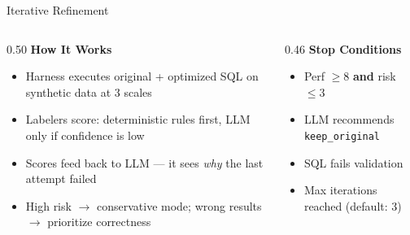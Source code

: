 \documentclass[10pt,aspectratio=169]{beamer}
\newcommand{\Raleway}{\sffamily}
\begin{document}
\begin{frame}{Iterative Refinement}
{%
  }%

  \vspace{0.2em}

  \begin{columns}[T]

    \begin{column}{0.50\textwidth}
      {\small\Raleway\bfseries\color{aggieblue} How It Works}\\[0.2em]
      \footnotesize
      \begin{itemize}
        \setlength{\itemsep}{0.25em}
        \item Harness executes original + optimized SQL on synthetic data at 3 scales
        \item Labelers score: deterministic rules first, LLM only if confidence is low
        \item Scores feed back to LLM --- it sees \textit{why} the last attempt failed
        \item High risk $\to$ conservative mode; wrong results $\to$ prioritize correctness
      \end{itemize}
    \end{column}

    \begin{column}{0.46\textwidth}
      {\small\Raleway\bfseries\color{aggieblue} Stop Conditions}\\[0.2em]
      \footnotesize
      \begin{itemize}
        \setlength{\itemsep}{0.25em}
        \item Perf $\geq 8$ \textbf{and} risk $\leq 3$
        \item LLM recommends \texttt{keep\_original}
        \item SQL fails validation
        \item Max iterations reached (default: 3)
      \end{itemize}

    \end{column}

  \end{columns}
\end{frame}
\end{document}
